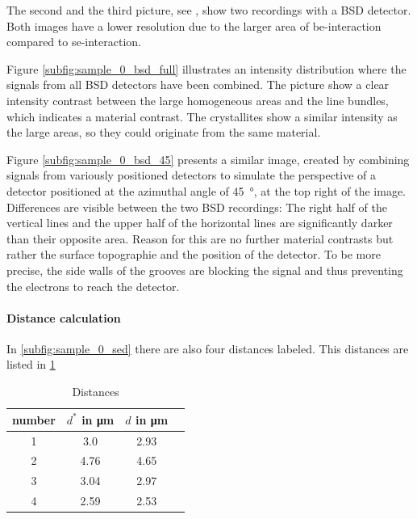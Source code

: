 The second and the third picture, see
, show two
recordings with a BSD detector.
Both images have a lower resolution due to the larger area of
\ac{be}-interaction compared to \ac{se}-interaction.

Figure \cref{subfig:sample_0_bsd_full} illustrates an intensity distribution
where the signals from all BSD detectors have been combined.
The picture show a clear intensity contrast between the large homogeneous
areas and the line bundles, which indicates a material contrast.
The crystallites show a similar intensity as the large areas, so they could
originate from the same material.

Figure \ref{subfig:sample_0_bsd_45} presents a similar image, created by
combining signals from variously positioned detectors to simulate the
perspective of a detector positioned at the azimuthal angle of
\qty{45}{\degree}, at the top right of the image.
Differences are visible between the two BSD recordings: The right
half of the vertical lines and the upper half of the horizontal lines
are significantly darker than their opposite area.
Reason for this are no further material contrasts but rather the surface
topographie and the position of the detector.
To be more precise, the side walls of the grooves are blocking the signal and
thus preventing the electrons	to reach the detector.

\paragraph{Distance calculation}
In \cref{subfig:sample_0_sed} there are also four distances labeled.
This distances are listed in \cref{tab:distances}

\begin{table}[h]
	\centering
	\begin{tabular}{cccc}
		\toprule
		number & $d^*$ in \unit{\micro\meter} & $d$ in \unit{\micro\meter} \\
		\midrule
		1      & \num{3.0}                    & \num{2.93}                 \\
		2      & \num{4.76}                   & \num{4.65}                 \\
		3      & \num{3.04}                   & \num{2.97}                 \\
		4      & \num{2.59}                   & \num{2.53}                 \\
		\bottomrule
	\end{tabular}
	\caption{Distances}
	\label{tab:distances}
\end{table}


